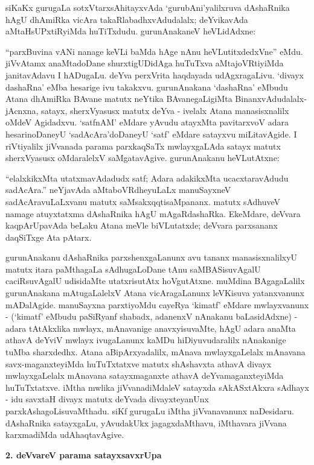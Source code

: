 siKaKx gurugaLa sotxVtarxsAhitayxvAda `gurubAni'yalilxruva dAshaRnika hAgU dhAmiRka vicAra takaRlabadhxvAdudalalx; deYvikavAda aMtaHsUPxtiRyiMda huTiTxdudu. gurunAnakaneV heVLidAdxne:

``parxBuvina vANi nanage keVLi baMda hAge nAnu heVLutitxdedxVne'' eMdu. jiVvAtamx anaMtadoDane shurxtigUDidAga huTuTxva aMtajoVRtiyiMda janitavAdavu I hADugaLu. deYva perxVrita haqdayada udAgxragaLivu. `divayx dashaRna' eMba hesarige ivu takakxvu. gurunAnakana `dashaRna' eMbudu Atana dhAmiRka BAvane matutx neYtika BAvanegaLigiMta BinanxvAdudalalx-jAcnxna, satayx, sherxVyasusx matutx deYva - ivelalx Atana manasisxnalilx oMdeV Agidadxvu. `satfnAM' eMdare yAvudu atayxMta pavitarxvoV adara hesarinoDaneyU `sadAcAra'doDaneyU `satf' eMdare satayxvu miLitavAgide. I riVtiyalilx jiVvanada parama parxkaqSaTx mwlayxgaLAda satayx matutx sherxVyasusx oMdaralelxV saMgatavAgive. gurunAnakanu heVLutAtxne:

``elalxkikxMta utatxmavAdadudx satf; Adara adakikxMta ucacxtaravAdudu sadAcAra.'' neYjavAda aMtaboVRdheyuLaLx manuSayxneV sadAcAravuLaLxvanu matutx saMsakxqqtisaMpananx. matutx sAdhuveV namage atuyxtatxma dAshaRnika hAgU mAgaRdashaRka. EkeMdare, deVvara kaqpArUpavAda beLaku Atana meVle biVLutatxde; deVvara parxsananx daqSiTxge Ata pAtarx.

gurunAnakanu dAshaRnika parxshenxgaLanunx avu tananx manasisxnalilxyU matutx itara paMthagaLa sAdhugaLoDane tAnu saMBASisuvAgalU caciRsuvAgalU udisidaMte utatxrisutAtx hoVgutAtxne. muMdina BAgagaLalilx gurunAnakana mAtugaLalelxV Atana vicAragaLanunx leVKisuva yatanxvanunx mADalAgide. manuSayxna parxtiyoMdu cayeRya `kimatf' eMdare mwlayxvanunx - (`kimatf' eMbudu paSiRyanf shabadx, adanenxV nAnakanu baLasidAdxne) - adara tAtAkxlika mwlayx, mAnavanige anavxyisuvaMte, hAgU adara anaMta athavA deYviV mwlayx ivugaLanunx kaMDu hiDiyuvudaralilx nAnakanige tuMba sharxdedhx. Atana aBipArxyadalilx, mAnava mwlayxgaLelalx mAnavana savx-maganxteyiMda huTuTxtatxve matutx shAshavxta athavA divayx mwlayxgaLelalx mAnavana satayxmaganxte athavA deYvamaganxteyiMda huTuTxtatxve. iMtha mwlika jiVvanadiMdaleV satayxda sAkASxtAkxra sAdhayx - idu savxtaH divayx matutx deYvada divayxteyanUnx parxkAshagoLisuvaMthadu. siKf gurugaLu iMtha jiVvanavanunx naDesidaru. dAshaRnika satayxgaLu, yAvudakUkx jagagxdaMthavu, iMthavara jiVvana karxmadiMda udAhaqtavAgive.

\smallskip
\begin{center}
{\Large\bf 2. deVvareV parama satayxsavxrUpa}
\end{center}

